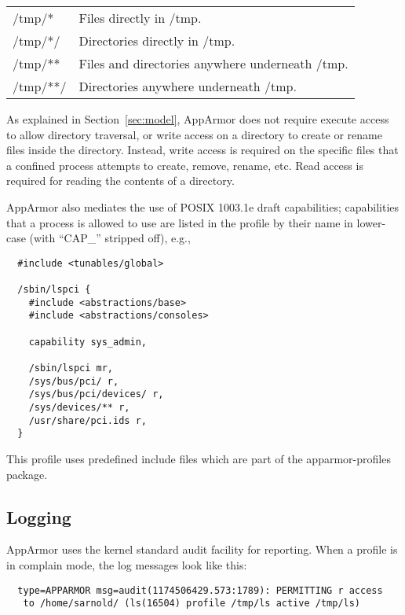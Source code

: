 \documentclass[a4paper]{article}
\begin{document}
\begin{tabbing}
\begin{tabular}{ll}
{/tmp/*}	& Files directly in /tmp.				\\
{/tmp/*/}	& Directories directly in /tmp.				\\
{/tmp/**}	& Files and directories anywhere underneath /tmp.	\\
{/tmp/**/}	& Directories anywhere underneath /tmp.			\\
\end{tabular}
\end{tabbing}

As explained in Section~\ref{sec:model}, AppArmor does not require
execute access to allow directory traversal, or write access on a
directory to create or rename files inside the directory. Instead, write
access is required on the specific files that a confined process
attempts to create, remove, rename, etc.  Read access is required for
reading the contents of a directory.

AppArmor also mediates the use of POSIX 1003.1e draft capabilities;
capabilities that a process is allowed to use are listed in the
profile by their name in lower-case (with ``CAP\_'' stripped off), e.g.,

\begin{small}
\begin{verbatim}
  #include <tunables/global>

  /sbin/lspci {
    #include <abstractions/base>
    #include <abstractions/consoles>

    capability sys_admin,

    /sbin/lspci mr,
    /sys/bus/pci/ r,
    /sys/bus/pci/devices/ r,
    /sys/devices/** r,
    /usr/share/pci.ids r,
  }
\end{verbatim}
\end{small}

This profile uses predefined include files which are part of the
apparmor-profiles package.

\subsection{Logging}

AppArmor uses the kernel standard audit facility for reporting.  When a
profile is in complain mode, the log messages look like this:

\begin{small}
\begin{verbatim}
  type=APPARMOR msg=audit(1174506429.573:1789): PERMITTING r access
   to /home/sarnold/ (ls(16504) profile /tmp/ls active /tmp/ls)
\end{verbatim}
\end{small}
\end{document}

